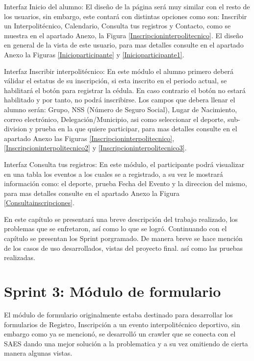 	\noindent Interfaz Inicio del alumno: El diseño de la página será muy similar con el resto de los usuarios, sin embargo, este contará con distintas opciones como son: Inscribir un Interpolitécnico, Calendario, Consulta tus registros y Contacto, como se muestra en el apartado Anexo, la Figura 	\ref{Inscripcioninterpolitecnico}. El diseño en general de la vista de este usuario, para mas detalles consulte en el apartado Anexo la Figuras \ref{Inicioparticipante} y \ref{Inicioparticipante1}.
	\newline
	
	\noindent Interfaz Inscribir interpolitécnico: En este módulo el alumno primero deberá válidar el estatus de su inscripción, si esta inscrito en el periodo actual, se habilitará el botón para registrar la cédula. En caso contrario el botón no estará habilitado y por tanto, no podrá inscribirse. Los campos que debera llenar el alumno serán: Grupo, NSS (Número de Seguro Social), Lugar de Nacimiento, correo electrónico, Delegación/Municipio, asi como seleccionar el deporte, sub-division y prueba en la que quiere participar, para mas detalles consulte en el apartado Anexo las Figuras \ref{Inscripcioninterpolitecnico}, \ref{Inscripcioninterpolitecnico2} y \ref{Inscripcioninterpolitecnico3}.
	\newline
	
	\noindent Interfaz Consulta tus registros: En este módulo, el participante podrá visualizar en una tabla los eventos a los cuales se a registrado, a su vez le mostrará información como: el deporte, prueba Fecha del Evento y la direccion del mismo, para mas detalles consulte en el apartado Anexo la Figura \ref{Consultainscripciones}.
	\newline

	\noindent En este capítulo se presentará una breve descripción del trabajo realizado, los problemas que se enfretaron, así como lo que se logró. Continuando con el capítulo se presentan los Sprint porgramado. 
	De manera breve se hace mención de los casos de uso desarrollados, vistas del proyecto final. así como las pruebas realizadas.
	
	\section{Sprint 3: Módulo de formulario}	
	El módulo de formulario originalmente estaba destinado para desarrollar los formularios de Registro, Inscripción a un evento interpolitécnico deportivo, sin embargo como ya se mencionó, se desarrolló un crawler que se conecta con el SAES dando una mejor solución a la problematica y a su vez omitiendo de cierta manera algunas vistas.
	\pagebreak
		

